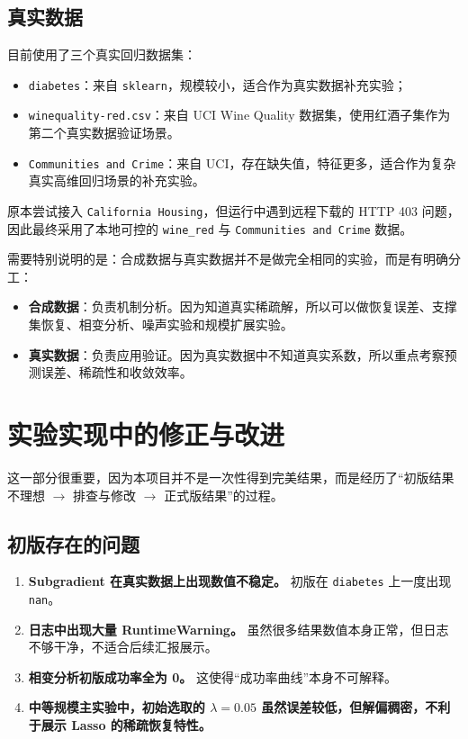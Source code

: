\documentclass[12pt,a4paper]{ctexart}
\begin{document}
\subsection{真实数据}
目前使用了三个真实回归数据集：
\begin{itemize}[leftmargin=2em]
    \item \texttt{diabetes}：来自 \texttt{sklearn}，规模较小，适合作为真实数据补充实验；
    \item \texttt{winequality-red.csv}：来自 UCI Wine Quality 数据集，使用红酒子集作为第二个真实数据验证场景。
    \item \texttt{Communities and Crime}：来自 UCI，存在缺失值，特征更多，适合作为复杂真实高维回归场景的补充实验。
\end{itemize}

原本尝试接入 \texttt{California Housing}，但运行中遇到远程下载的 HTTP 403 问题，因此最终采用了本地可控的 \texttt{wine\_red} 与 \texttt{Communities and Crime} 数据。

需要特别说明的是：合成数据与真实数据并不是做完全相同的实验，而是有明确分工：
\begin{itemize}[leftmargin=2em]
    \item \textbf{合成数据}：负责机制分析。因为知道真实稀疏解，所以可以做恢复误差、支撑集恢复、相变分析、噪声实验和规模扩展实验。
    \item \textbf{真实数据}：负责应用验证。因为真实数据中不知道真实系数，所以重点考察预测误差、稀疏性和收敛效率。
\end{itemize}

\section{实验实现中的修正与改进}
这一部分很重要，因为本项目并不是一次性得到完美结果，而是经历了“初版结果不理想 $\rightarrow$ 排查与修改 $\rightarrow$ 正式版结果”的过程。

\subsection{初版存在的问题}
\begin{enumerate}[label=\arabic*.]
    \item \textbf{Subgradient 在真实数据上出现数值不稳定。} 初版在 \texttt{diabetes} 上一度出现 \texttt{nan}。
    \item \textbf{日志中出现大量 RuntimeWarning。} 虽然很多结果数值本身正常，但日志不够干净，不适合后续汇报展示。
    \item \textbf{相变分析初版成功率全为 0。} 这使得“成功率曲线”本身不可解释。
    \item \textbf{中等规模主实验中，初始选取的 $\lambda=0.05$ 虽然误差较低，但解偏稠密，不利于展示 Lasso 的稀疏恢复特性。}
\end{enumerate}
\end{document}
